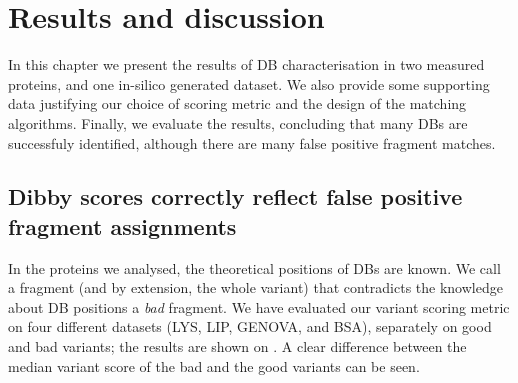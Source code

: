 \chapter{Results and discussion}

In this chapter we present the results of DB characterisation in two measured proteins, and one in-silico generated dataset. We also provide some supporting data justifying our choice of scoring metric and the design of the matching algorithms. Finally, we evaluate the results, concluding that many DBs are successfuly identified, although there are many false positive fragment matches.

\section{Dibby scores correctly reflect false positive fragment assignments}

In the proteins we analysed, the theoretical positions of DBs are known. We call a fragment (and by extension, the whole variant) that contradicts the knowledge about DB positions a \emph{bad} fragment. We have evaluated our variant scoring metric on four different datasets (LYS, LIP, GENOVA, and BSA), separately on good and bad variants; the results are shown on . A clear difference between the median variant score of the bad and the good variants can be seen.

